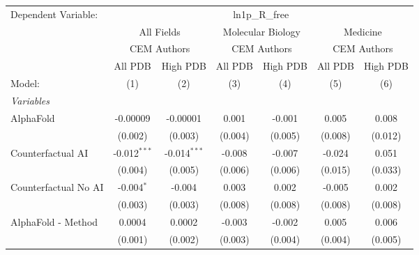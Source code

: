 \begingroup
\centering
\begin{tabular}{lcccccc}
   \tabularnewline \midrule \midrule
   Dependent Variable: & \multicolumn{6}{c}{ln1p\_R\_free}\\
 & \multicolumn{2}{c}{All Fields} & \multicolumn{2}{c}{Molecular Biology} & \multicolumn{2}{c}{Medicine} \\
\cmidrule(lr){2-3} \cmidrule(lr){4-5} \cmidrule(lr){6-7}
 & \multicolumn{2}{c}{CEM Authors} & \multicolumn{2}{c}{CEM Authors} & \multicolumn{2}{c}{CEM Authors} \\
\cmidrule(lr){2-3} \cmidrule(lr){4-5} \cmidrule(lr){6-7}
 & \multicolumn{1}{c}{All PDB} & \multicolumn{1}{c}{High PDB} & \multicolumn{1}{c}{All PDB} & \multicolumn{1}{c}{High PDB} & \multicolumn{1}{c}{All PDB} & \multicolumn{1}{c}{High PDB} \\
\cmidrule(lr){2-2} \cmidrule(lr){3-3} \cmidrule(lr){4-4} \cmidrule(lr){5-5} \cmidrule(lr){6-6} \cmidrule(lr){7-7}
   Model:                                                     & (1)            & (2)            & (3)          & (4)      & (5)           & (6)\\  
   \midrule
   \emph{Variables}\\
   AlphaFold                                                  & -0.00009       & -0.00001       & 0.001        & -0.001   & 0.005         & 0.008\\   
                                                              & (0.002)        & (0.003)        & (0.004)      & (0.005)  & (0.008)       & (0.012)\\   
   Counterfactual AI                                          & -0.012$^{***}$ & -0.014$^{***}$ & -0.008       & -0.007   & -0.024        & 0.051\\   
                                                              & (0.004)        & (0.005)        & (0.006)      & (0.006)  & (0.015)       & (0.033)\\   
   Counterfactual No AI                                       & -0.004$^{*}$   & -0.004         & 0.003        & 0.002    & -0.005        & 0.002\\   
                                                              & (0.003)        & (0.003)        & (0.008)      & (0.008)  & (0.008)       & (0.008)\\   
   AlphaFold - Method                                         & 0.0004         & 0.0002         & -0.003       & -0.002   & 0.005         & 0.006\\   
                                                              & (0.001)        & (0.002)        & (0.003)      & (0.004)  & (0.004)       & (0.005)\\   

\end{tabular}
